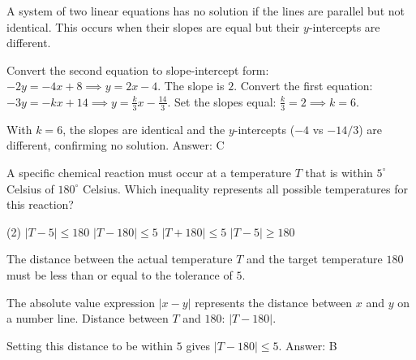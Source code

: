 \documentclass[11pt,paper=a4,answers]{exam}
\begin{document}
\begin{questions}
\begin{solution}
A system of two linear equations has no solution if the lines are parallel but not identical. This occurs when their slopes are equal but their $y$-intercepts are different.
\vspace{5pt}
\begin{center}
Convert the second equation to slope-intercept form:
\vspace{5pt}
$-2y = -4x + 8 \implies y = 2x - 4$. The slope is $2$.
\vspace{5pt}
Convert the first equation:
\vspace{5pt}
$-3y = -kx + 14 \implies y = \frac{k}{3}x - \frac{14}{3}$.
\vspace{5pt}
Set the slopes equal: $\frac{k}{3} = 2 \implies k = 6$.
\end{center}
\vspace{5pt}
With $k=6$, the slopes are identical and the $y$-intercepts ($-4$ vs $-14/3$) are different, confirming no solution.
\vspace{5pt}
Answer: \colorbox{yellow!100}{C}
\end{solution}

\vspace{1cm}

\question
A specific chemical reaction must occur at a temperature $T$ that is within $5^\circ$ Celsius of $180^\circ$ Celsius. Which inequality represents all possible temperatures for this reaction?
\begin{tasks}(2)
\task $|T - 5| \leq 180$
\task $|T - 180| \leq 5$
\task $|T + 180| \leq 5$
\task $|T - 5| \geq 180$
\end{tasks}

\begin{solution}
The distance between the actual temperature $T$ and the target temperature $180$ must be less than or equal to the tolerance of $5$.
\vspace{5pt}
\begin{center}
The absolute value expression $|x - y|$ represents the distance between $x$ and $y$ on a number line.
\vspace{5pt}
Distance between $T$ and $180$: $|T - 180|$.
\end{center}
\vspace{5pt}
Setting this distance to be within $5$ gives $|T - 180| \leq 5$.
\vspace{5pt}
Answer: \colorbox{yellow!100}{B}
\end{solution}


\end{questions}
\end{document}
